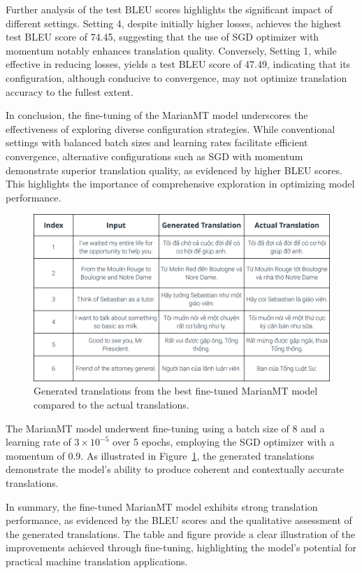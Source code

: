 \documentclass{article}
\begin{document}
Further analysis of the test BLEU scores highlights the significant impact of different settings. Setting 4, despite initially higher losses, achieves the highest test BLEU score of 74.45, suggesting that the use of SGD optimizer with momentum notably enhances translation quality. Conversely, Setting 1, while effective in reducing losses, yields a test BLEU score of 47.49, indicating that its configuration, although conducive to convergence, may not optimize translation accuracy to the fullest extent.

In conclusion, the fine-tuning of the MarianMT model underscores the effectiveness of exploring diverse configuration strategies. While conventional settings with balanced batch sizes and learning rates facilitate efficient convergence, alternative configurations such as SGD with momentum demonstrate superior translation quality, as evidenced by higher BLEU scores. This highlights the importance of comprehensive exploration in optimizing model performance.
\begin{figure}[H]
    \centering
    \includegraphics[width=\textwidth]{figs/MarianMT.png}
    \caption{Generated translations from the best fine-tuned MarianMT model compared to the actual translations.}
    \label{fig:MarianMT_comparison}
\end{figure}

The MarianMT model underwent fine-tuning using a batch size of 8 and a learning rate of  $3 \times 10^{-5}$ over 5 epochs, employing the SGD optimizer with a momentum of 0.9. As illustrated  in Figure~\ref{fig:MarianMT_comparison}, the generated translations demonstrate the model's ability to produce coherent and contextually accurate translations. 

In summary, the fine-tuned MarianMT model exhibits strong translation performance, as evidenced by the BLEU scores and the qualitative assessment of the generated translations. The table and figure provide a clear illustration of the improvements achieved through fine-tuning, highlighting the model's potential for practical machine translation applications.
\end{document}
